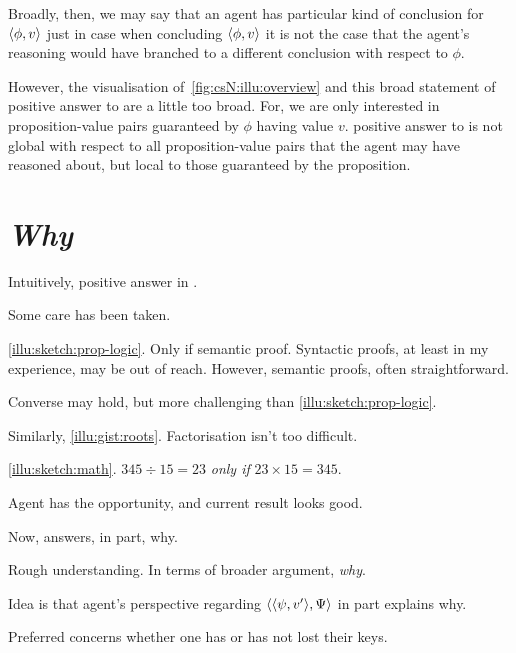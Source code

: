 \begin{note}
  Broadly, then, we may say that an agent has {\color{red} particular kind of conclusion} for \(\langle \phi, v \rangle\) just in case when concluding \(\langle \phi, v \rangle\) it is not the case that the agent's reasoning would have branched to a different conclusion with respect to \(\phi\).

  However, the visualisation of~\autoref{fig:csN:illu:overview} and this broad statement of {\color{red} positive answer to \qzS{}} are a little too broad.
  For, we are only interested in proposition-value pairs guaranteed by \(\phi\) having value \(v\).
  {\color{red} positive answer to \qzS{}} is not global with respect to all proposition-value pairs that the agent may have reasoned about, but local to those guaranteed by the proposition.
\end{note}

\section{\emph{Why}}
\label{cha:zS:section:qzs-and-why}

\begin{note}
  Intuitively, positive answer in .

  Some care has been taken.

  \autoref{illu:sketch:prop-logic}.
  Only if semantic proof.
  Syntactic proofs, at least in my experience, may be out of reach.
  However, semantic proofs, often straightforward.

  Converse may hold, but more challenging than \autoref{illu:sketch:prop-logic}.

  Similarly, \autoref{illu:gist:roots}.
  Factorisation isn't too difficult.

  \autoref{illu:sketch:math}.
  \(345 \div 15 = 23\) \emph{only if} \(23 \times 15 = 345\).

  Agent has the opportunity, and current result looks good.
\end{note}

\begin{note}
  Now, answers, in part, why.
\end{note}

\begin{note}
  Rough understanding.
  In terms of broader argument, \emph{why}.

  Idea is that agent's perspective regarding \(\langle \langle \psi, v' \rangle, \Psi \rangle\) in part explains why.

  Preferred  concerns whether one has or has not lost their keys.
\end{note}

